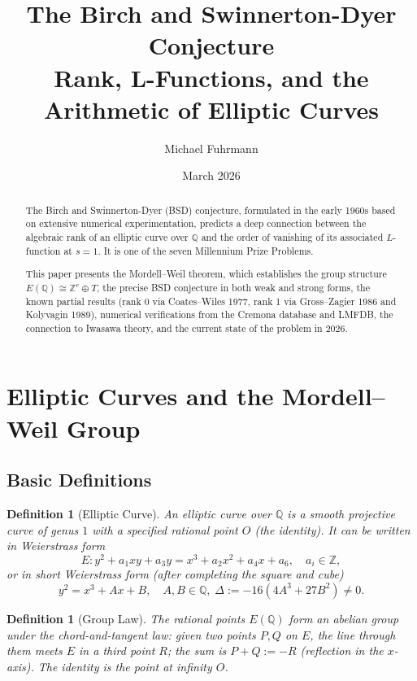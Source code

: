 \documentclass[12pt,a4paper]{article}
\title{\textbf{The Birch and Swinnerton-Dyer Conjecture}\\[0.5em]
\large Rank, L-Functions, and the Arithmetic of Elliptic Curves}
\author{Michael Fuhrmann}
\date{March 2026}
\newtheorem{definition}[theorem]{Definition}
\theoremstyle{remark}
\begin{document}
\maketitle
\begin{abstract}
The Birch and Swinnerton-Dyer (BSD) conjecture, formulated in the early 1960s based on
extensive numerical experimentation, predicts a deep connection between the algebraic rank
of an elliptic curve over $\mathbb{Q}$ and the order of vanishing of its associated
$L$-function at $s=1$.  It is one of the seven Millennium Prize Problems.

This paper presents the Mordell--Weil theorem, which establishes the group structure
$E(\mathbb{Q}) \cong \mathbb{Z}^r \oplus T$, the precise BSD conjecture in both weak and
strong forms, the known partial results (rank 0 via Coates--Wiles 1977, rank 1 via
Gross--Zagier 1986 and Kolyvagin 1989), numerical verifications from the Cremona database
and LMFDB, the connection to Iwasawa theory, and the current state of the problem in 2026.
\end{abstract}

\tableofcontents
\newpage

\section{Elliptic Curves and the Mordell--Weil Group}

\subsection{Basic Definitions}

\begin{definition}[Elliptic Curve]
  An \emph{elliptic curve} over $\mathbb{Q}$ is a smooth projective curve of genus $1$
  with a specified rational point $O$ (the identity).  It can be written in
  \emph{Weierstrass form}
  \begin{equation}\label{eq:weierstrass}
    E\colon y^2 + a_1 xy + a_3 y = x^3 + a_2 x^2 + a_4 x + a_6,
    \quad a_i \in \mathbb{Z},
  \end{equation}
  or in \emph{short Weierstrass form} (after completing the square and cube)
  \[
    y^2 = x^3 + Ax + B, \quad A,B\in\mathbb{Q},\; \Delta := -16(4A^3 + 27B^2) \neq 0.
  \]
\end{definition}

\begin{definition}[Group Law]
  The rational points $E(\mathbb{Q})$ form an abelian group under the chord-and-tangent
  law: given two points $P, Q$ on $E$, the line through them meets $E$ in a third point
  $R$; the sum is $P + Q := -R$ (reflection in the $x$-axis).  The identity is the point
  at infinity $O$.
\end{definition}
\end{document}
